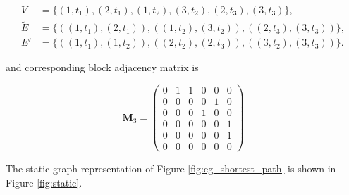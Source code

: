 \documentclass[12pt]{article}
\theoremstyle{definition}
\begin{document}
\begin{align*}
V & = \{(1,\!t_1), (2,\!t_1), (1,\!t_2), (3,\!t_2), (2,\!t_3), (3,\!t_3)\},\\
\tilde E &= \{((1,\!t_1), (2,\!t_1)), ((1,\!t_2), (3,\!t_2)), ((2,\!t_3), (3,\!t_3))\},\\
E'  &= \{((1,\!t_1), (1,\!t_2)), ((2,\!t_2), (2,\!t_3)), ((3,\!t_2), (3,\!t_3))\}.
\end{align*}

and corresponding block adjacency matrix is

\[
\bm M_3 = \begin{pmatrix}
0 & 1 & 1 & 0 & 0 & 0 \\
0 & 0 & 0 & 0 & 1 & 0 \\
0 & 0 & 0 & 1 & 0 & 0 \\
0 & 0 & 0 & 0 & 0 & 1 \\
0 & 0 & 0 & 0 & 0 & 1 \\
0 & 0 & 0 & 0 & 0 & 0
\end{pmatrix}
\]

The static graph representation of Figure \ref{fig:eg_shortest_path} is shown in Figure \ref{fig:static}.
\end{document}
